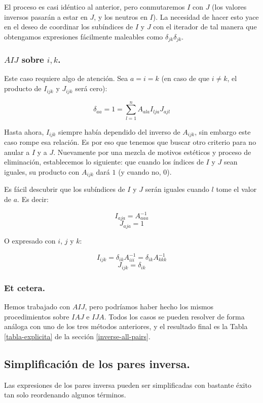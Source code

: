 El proceso es casi idéntico al anterior, pero conmutaremos $I$ con $J$ (los valores inversos pasarán a estar en $J$, y los neutros en $I$). La necesidad de hacer esto yace en el deseo de coordinar los subíndices de $I$ y $J$ con el iterador de tal manera que obtengamos expresiones fácilmente maleables como $\delta_{jk} \delta_{jk}$.

\subsubsection{$AIJ$ sobre $i, k$.}

Este caso requiere algo de atención. Sea $a = i = k$ (en caso de que $i \neq k$, el producto de $I_{ijk}$ y $J_{ijk}$ será cero):

$$\delta_{aa} = 1 = \sum\limits_{l = 1}^{n} A_{ala} I_{lja} J_{ajl}$$

Hasta ahora, $I_{ijk}$ siempre había dependido del inverso de $A_{ijk}$, sin embargo este caso rompe esa relación. Es por eso que tenemos que buscar otro criterio para no anular a $I$ y a $J$. Nuevamente por una mezcla de motivos estéticos y proceso de eliminación, establecemos lo siguiente: que cuando los índices de $I$ y $J$ sean iguales, su producto con $A_{ijk}$ dará $1$ (y cuando no, $0$).

Es fácil descubrir que los subíndices de $I$ y $J$ serán iguales cuando $l$ tome el valor de $a$. Es decir:

$$I_{aja} = A_{aaa}^{-1}$$
$$J_{aja} = 1$$

O expresado con $i$, $j$ y $k$:

$$I_{ijk} = \delta_{ik} A_{iii}^{-1} = \delta_{ik} A_{kkk}^{-1}$$
$$J_{ijk} = \delta_{ik}$$

\subsubsection{Et cetera.}

Hemos trabajado con $AIJ$, pero podríamos haber hecho los mismos procedimientos sobre $IAJ$ e $IJA$. Todos los casos se pueden resolver de forma análoga con uno de los tres métodos anteriores, y el resultado final es la Tabla \ref{tabla-explicita} de la sección \ref{inverse-all-pairs}.

\subsection{Simplificación de los pares inversa.} \label{appendix-4}

Las expresiones de los pares inversa pueden ser simplificadas con bastante éxito tan solo reordenando algunos términos.

